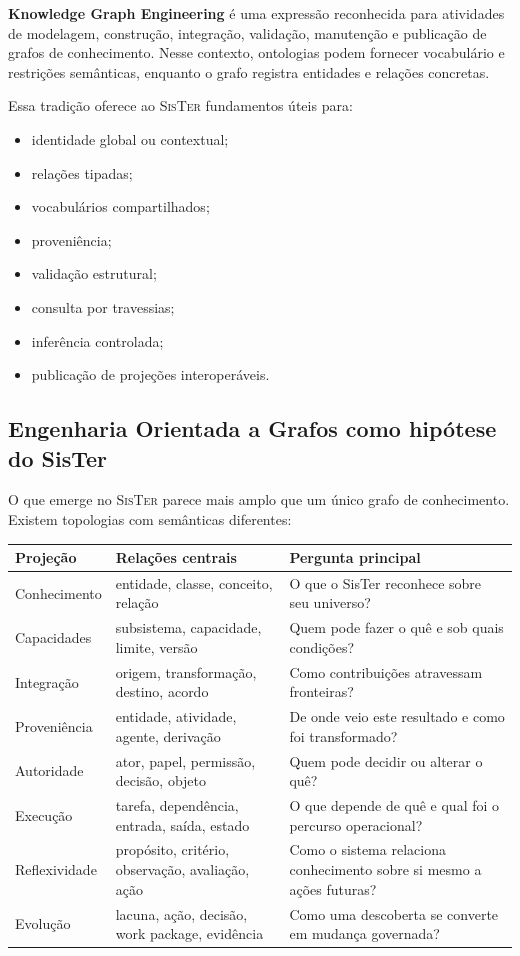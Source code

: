 \documentclass[11pt,a4paper,oneside]{article}
\newcommand{\termo}[1]{\textbf{#1}}
\newcommand{\sister}{\textsc{SisTer}}
\begin{document}
\termo{Knowledge Graph Engineering} é uma expressão reconhecida para atividades de modelagem, construção, integração, validação, manutenção e publicação de grafos de conhecimento. Nesse contexto, ontologias podem fornecer vocabulário e restrições semânticas, enquanto o grafo registra entidades e relações concretas.

Essa tradição oferece ao \sister{} fundamentos úteis para:

\begin{itemize}
  \item identidade global ou contextual;
  \item relações tipadas;
  \item vocabulários compartilhados;
  \item proveniência;
  \item validação estrutural;
  \item consulta por travessias;
  \item inferência controlada;
  \item publicação de projeções interoperáveis.
\end{itemize}

\subsection{Engenharia Orientada a Grafos como hipótese do SisTer}

O que emerge no \sister{} parece mais amplo que um único grafo de conhecimento. Existem topologias com semânticas diferentes:

\begin{longtable}{P{3.5cm}P{5.2cm}P{4.7cm}}
\toprule
\textbf{Projeção} & \textbf{Relações centrais} & \textbf{Pergunta principal} \\
\midrule
\endhead
Conhecimento & entidade, classe, conceito, relação & O que o SisTer reconhece sobre seu universo? \\
Capacidades & subsistema, capacidade, limite, versão & Quem pode fazer o quê e sob quais condições? \\
Integração & origem, transformação, destino, acordo & Como contribuições atravessam fronteiras? \\
Proveniência & entidade, atividade, agente, derivação & De onde veio este resultado e como foi transformado? \\
Autoridade & ator, papel, permissão, decisão, objeto & Quem pode decidir ou alterar o quê? \\
Execução & tarefa, dependência, entrada, saída, estado & O que depende de quê e qual foi o percurso operacional? \\
Reflexividade & propósito, critério, observação, avaliação, ação & Como o sistema relaciona conhecimento sobre si mesmo a ações futuras? \\
Evolução & lacuna, ação, decisão, work package, evidência & Como uma descoberta se converte em mudança governada? \\
\bottomrule
\end{longtable}
\end{document}
